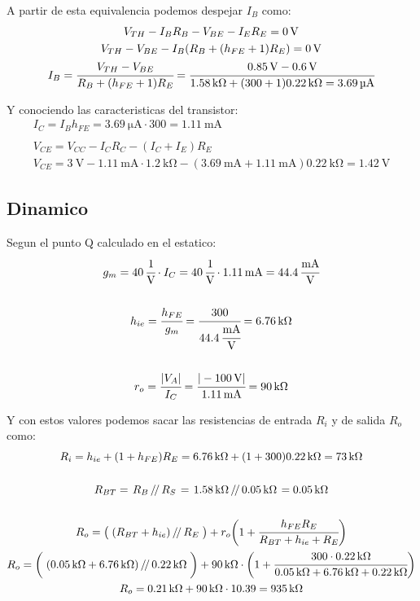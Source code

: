 \documentclass[a4paper,12pt]{article}
\newcommand{\parallelTwo}[2]{\left.#1\,\middle/\!\middle/\,#2\right.}
\newcommand{\mR}[1]{\SI{#1}{\kilo\ohm}}
\newcommand{\mI}[1]{\SI{#1}{\milli\ampere}}
\newcommand{\mIu}[1]{\SI{#1}{\micro\ampere}}
\newcommand{\mV}[1]{\SI{#1}{\volt}}
\begin{document}
    A partir de esta equivalencia podemos despejar $I_B$ como:
    \begin{gather*}
        V_{TH} - I_B R_B - V_{BE} - I_E R_E = \mV{0} \\
        V_{TH} - V_{BE} - I_B ( R_B + (h_{FE}+1) R_E ) = \mV{0} \\
        I_B = \cfrac{V_{TH} - V_{BE}}{R_B + ( h_{FE}+1 ) R_E} 
            = \cfrac{ \mV{0.85} - \mV{0.6} } { \mR{1.58} + (300+1) \mR{0.22} = \mIu{3.69} }
    \end{gather*}

    Y conociendo las caracteristicas del transistor:
    \begin{gather*}
        I_C = I_B h_{FE} = \mIu{3.69} \cdot 300 = \mI{1.11}
        \\ \\
        V_{CE} = V_{CC} - I_C R_C - (I_C + I_E) R_E \\
        V_{CE} = \mV{3} - \mI{1.11} \cdot \mR{1.2} - ( \mI{3.69} + \mI{1.11} ) \mR{0.22} = \mV{1.42}
    \end{gather*}


\subsection{Dinamico}
    Segun el punto Q calculado en el estatico:
    \begin{gather*}
        g_m = \SI{40}{\cfrac{1}{\volt}} \cdot I_C = \SI{40}{\cfrac{1}{\volt}} \cdot \mI{1.11} = \SI{44.4}{\cfrac{mA}{V}}
        \\ \\
        h_{ie} = \cfrac{h_{FE}}{g_m} = \cfrac{300}{\SI{44.4}{\cfrac{mA}{V}}} = \mR{6.76}
        \\ \\
        r_o = \cfrac{| V_A |}{I_C} = \cfrac{|\mV{-100}|}{\mI{1.11}} = \mR{90}
    \end{gather*}

    Y con estos valores podemos sacar las resistencias de entrada $R_i$ y de salida $R_o$ como:
    \begin{gather*}
        R_i = h_{ie} + (1+h_{FE}) R_E = \mR{6.76} + (1+300) \mR{0.22} = \mR{73}
        \\ \\
        R_{BT} = \parallelTwo{R_B}{R_S} = \parallelTwo{\mR{1.58}}{\mR{0.05}} = \mR{0.05}
        \\ \\
        R_o = \big( \parallelTwo{(R_{BT} + h_{ie})}{R_E} \big) + r_o \bigg( 1 + \cfrac{h_{FE} R_E}{R_{BT} + h_{ie} + R_E} \bigg) \\
        R_o = \bigg( \parallelTwo{(\mR{0.05} + \mR{6.76})}{\mR{0.22}} \bigg) + 
            \mR{90} \cdot \bigg( 1 + \cfrac{300 \cdot \mR{0.22}}{\mR{0.05} + \mR{6.76} + \mR{0.22}} \bigg) \\
        R_o = \mR{0.21} + \mR{90} \cdot 10.39 = \mR{935}
    \end{gather*}
\end{document}
